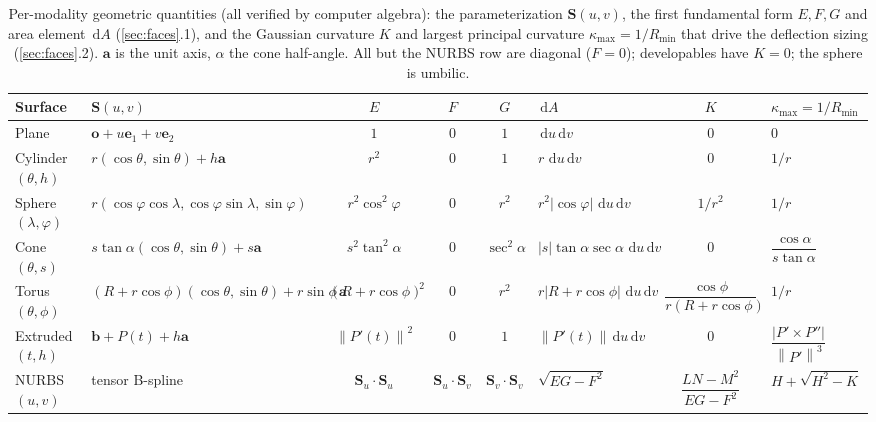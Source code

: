 \documentclass[11pt,a4paper]{article}
\numberwithin{equation}{section}
\newcommand{\norm}[1]{\left\lVert #1 \right\rVert}
\newcommand{\abs}[1]{\left\lvert #1 \right\rvert}
\newcommand{\vv}[1]{\mathbf{#1}}
\newcommand{\dd}{\,\mathrm{d}}
\newcommand{\Su}{\vv{S}_u}
\newcommand{\Sv}{\vv{S}_v}
\begin{document}
\begin{table}\centering
\caption{Per-modality geometric quantities (all verified by computer algebra):
the parameterization $\vv{S}(u,v)$, the first fundamental form $E,F,G$ and area
element $\dd A$ (\cref{sec:faces}.1), and the Gaussian curvature $K$ and largest
principal curvature $\kappa_{\max}=1/R_{\min}$ that drive the deflection sizing
(\cref{sec:faces}.2). $\vv{a}$ is the unit axis, $\alpha$ the cone half-angle.
All but the NURBS row are diagonal ($F=0$); developables have $K=0$; the sphere
is umbilic.}
\label{tab:geom}
\small
\begin{tabularx}{\textheight}{@{}l L c c c L c L@{}}
\toprule
Surface & $\vv{S}(u,v)$ & $E$ & $F$ & $G$ & $\dd A$ & $K$ & $\kappa_{\max}=1/R_{\min}$\\
\midrule
Plane & $\vv{o}+u\vv{e}_1+v\vv{e}_2$ & $1$ & $0$ & $1$ & $\dd u\dd v$ & $0$ & $0$\\
Cylinder $(\theta,h)$ & $r(\cos\theta,\sin\theta)+h\vv{a}$ & $r^2$ & $0$ & $1$ & $r\,\dd u\dd v$ & $0$ & $1/r$\\
Sphere $(\lambda,\varphi)$ & $r(\cos\varphi\cos\lambda,\cos\varphi\sin\lambda,\sin\varphi)$ & $r^2\cos^2\varphi$ & $0$ & $r^2$ & $r^2\abs{\cos\varphi}\,\dd u\dd v$ & $1/r^2$ & $1/r$\\
Cone $(\theta,s)$ & $s\tan\!\alpha(\cos\theta,\sin\theta)+s\vv{a}$ & $s^2\tan^2\!\alpha$ & $0$ & $\sec^2\!\alpha$ & $\abs{s}\tan\!\alpha\sec\!\alpha\,\dd u\dd v$ & $0$ & $\dfrac{\cos\alpha}{s\tan\alpha}$\\[4pt]
Torus $(\theta,\phi)$ & $(R{+}r\cos\phi)(\cos\theta,\sin\theta){+}r\sin\phi\,\vv{a}$ & $(R{+}r\cos\phi)^2$ & $0$ & $r^2$ & $r\abs{R{+}r\cos\phi}\,\dd u\dd v$ & $\dfrac{\cos\phi}{r(R{+}r\cos\phi)}$ & $1/r$\\[4pt]
Extruded $(t,h)$ & $\vv{b}+P(t)+h\vv{a}$ & $\norm{P'(t)}^2$ & $0$ & $1$ & $\norm{P'(t)}\dd u\dd v$ & $0$ & $\dfrac{\abs{P'\times P''}}{\norm{P'}^3}$\\[4pt]
NURBS $(u,v)$ & tensor B-spline \cite{PieglTiller1997} & $\Su\!\cdot\!\Su$ & $\Su\!\cdot\!\Sv$ & $\Sv\!\cdot\!\Sv$ & $\sqrt{EG{-}F^2}$ & $\dfrac{LN{-}M^2}{EG{-}F^2}$ & $H{+}\sqrt{H^2{-}K}$\\
\bottomrule
\end{tabularx}
\end{table}
\end{document}
